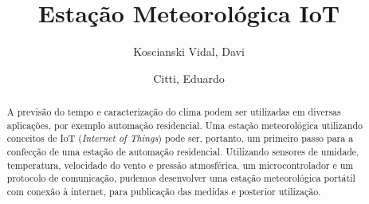 \documentclass[twocolumn,11pt]{article}
\title{Estação Meteorológica IoT}
\author{Koscianski Vidal, Davi \and Citti, Eduardo}
\begin{document}
\maketitle

\tableofcontents

\begin{abstract}
A previsão do tempo e caracterização do clima podem ser utilizadas em diversas aplicações, por exemplo automação residencial. Uma estação meteorológica utilizando conceitos de IoT (\textit{Internet of Things}) pode ser, portanto, um primeiro passo para a confecção de uma estação de automação residencial.
Utilizando sensores de umidade, temperatura, velocidade do vento e pressão atmosférica, um microcontrolador e um protocolo de comunicação, pudemos desenvolver uma estação meteorológica portátil com conexão à internet, para publicação das medidas e posterior utilização.
\end{abstract}
\end{document}
